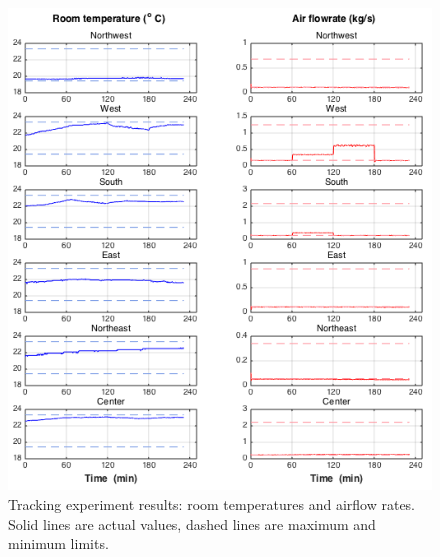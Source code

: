 \begin{figure}[t]
\centering
\includegraphics[width=\textwidth]{chapters/building_exp/figures/Track_temp_flow.png}
\caption{Tracking experiment results: room temperatures and airflow rates. Solid lines are actual values, dashed lines are maximum and minimum limits.}
\label{fig:track_temp_flow}
\end{figure}



%


